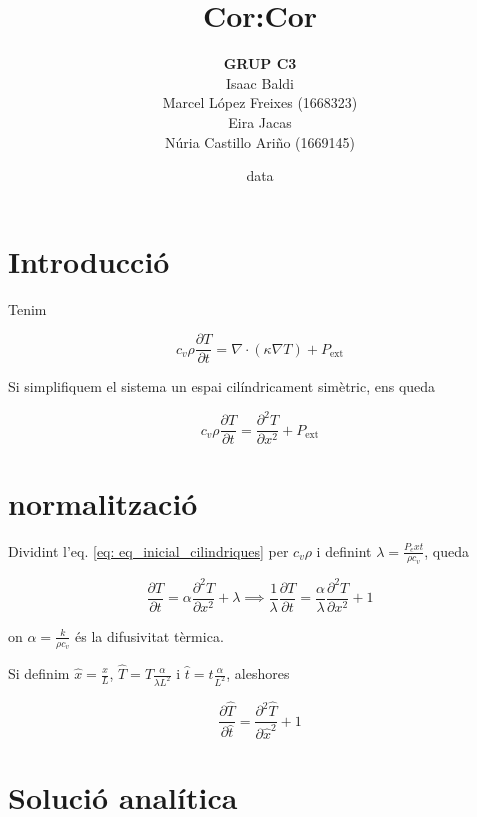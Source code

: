 \documentclass[11pt]{article}
\title{\Huge\bfseries Cor:Cor \\[1ex] \Large}
\author{\begin{tabular}{c}
\textbf{GRUP C3} \\
Isaac Baldi\\
Marcel López Freixes (1668323) \\
Eira Jacas\\
Núria Castillo Ariño (1669145)
\end{tabular}}
\date{data}
\begin{document}
\maketitle

\section{Introducció}


Tenim 

\begin{equation}
    c_v \rho \frac{\partial T}{\partial t} = \nabla \cdot (\kappa \nabla T) + P_{\text{ext}}
\label{eq: eq_inicial}
\end{equation}


Si simplifiquem el sistema un espai cilíndricament simètric, ens queda


\begin{equation}
    c_v \rho \frac{\partial T}{\partial t} = \frac{\partial^2 T}{\partial x^2} + P_{\text{ext}}
\label{eq: eq_inicial_cilindriques}
\end{equation}
\section{normalització}

Dividint l'eq. \eqref{eq: eq_inicial_cilindriques} per $c_v\rho$ i definint $\lambda=\frac{P_ext}{\rho c_v}$, queda

\begin{equation}
    \frac{\partial T}{\partial t} = \alpha \frac{\partial^2 T}{\partial x^2} + \lambda \implies \frac{1}{\lambda}\frac{\partial T}{\partial t} = \frac{\alpha}{\lambda} \frac{\partial^2 T}{\partial x^2} + 1
\label{eq: eq_entre_rhocv}
\end{equation}

on $\alpha=\frac{k}{\rho c_v}$ és la difusivitat tèrmica.

Si definim $\hat{x}=\frac{x}{L}$, $\hat{T}=T \frac{\alpha}{\lambda L^2}$ i $\hat{t}=t\frac{\alpha}{L^2}$, aleshores

\begin{equation}
    \frac{\partial \hat{T}}{\partial \hat{t}} = \frac{\partial^2 \hat{T}}{\partial \hat{x}^2} + 1
\label{eq: eq_normalitzada}
\end{equation}

\section{Solució analítica}
\end{document}
